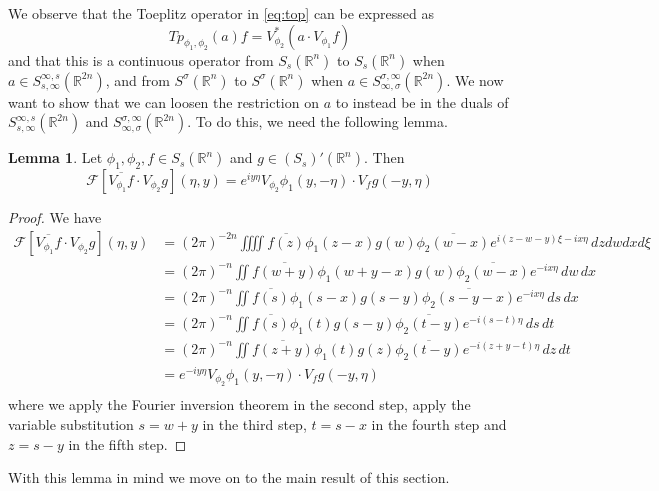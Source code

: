 \documentclass[11pt,a4paper,reqno]{amsart}
\numberwithin{equation}{section}
\theoremstyle{definition}
\newtheorem{lemma}[thm]{Lemma}
\theoremstyle{definition}
\begin{document}
    We observe that the Toeplitz operator in \eqref{eq:top} can be expressed as $$ Tp_{\phi_1,\phi_2}(a)f = V_{\phi_2}^*(a \cdot V_{\phi_1} f)$$
    and that this is a continuous operator from $S_s(\mathbb{R}^{n})$ to $S_s(\mathbb{R}^{n})$ when $a\in S_{s,\infty}^{\infty,s}(\mathbb{R}^{2 n})$, and from $S^\sigma(\mathbb{R}^{n})$ to $S^\sigma(\mathbb{R}^{n})$ when $a\in S_{\infty,\sigma}^{\sigma,\infty}(\mathbb{R}^{2 n})$. We now want to show that we can loosen the restriction on $a$ to instead be in the duals of $S_{s,\infty}^{\infty,s}(\mathbb{R}^{2 n})$ and $S_{\infty,\sigma}^{\sigma,\infty}(\mathbb{R}^{2 n})$. To do this, we need the following lemma.
    \begin{lemma}\label{lem:doubleFT}
    Let $\phi_1,\phi_2,f \in S_s(\mathbb{R}^n)$ and $g \in (S_s)'(\mathbb{R}^n)$. Then
    \begin{equation*}
        \mathscr{F} [\overline{V_{\phi_1} f} \cdot V_{\phi_2} g] (\eta,y) = e^{i y \eta} V_{\phi_2} \phi_1 (y,-\eta) \cdot   V_f g(-y,\eta)
    \end{equation*}
    \end{lemma}
    \begin{proof}
    We have
    \begin{align*}
      \mathscr{F} [\overline{V_{\phi_1} f} \cdot V_{\phi_2} g] (\eta,y) &= (2\pi)^{-2 n} \iiiint \overline{f(z)} \phi_1(z-x) g(w) \overline{\phi_2(w-x)} e^{i(z-w-y)\xi - i x\eta} \, d z d w d x d \xi \\ 
    &= (2\pi)^{- n} \iint \overline{f(w+y)} \phi_1(w+y-x) g(w) \overline{\phi_2(w-x)} e^{- i x\eta} \, d w \, d x \\
    &= (2\pi)^{- n} \iint \overline{f(s)} \phi_1(s-x) g(s-y) \overline{\phi_2(s-y-x)} e^{- i x\eta} \, d s \, d x \\
    &= (2\pi)^{- n} \iint \overline{f(s)} \phi_1(t) g(s-y) \overline{\phi_2(t-y)} e^{- i (s-t)\eta} \, d s \, d t \\
    &= (2\pi)^{- n} \iint \overline{f(z+y)} \phi_1(t) g(z) \overline{\phi_2(t-y)} e^{- i (z+y-t)\eta} \, d z \, d t \\
    &= e^{-i y \eta} V_{\phi_2} \phi_1 (y,-\eta) \cdot   V_f g(-y,\eta) \\
    \end{align*}
    where we apply the Fourier inversion theorem in the second step, apply the variable substitution $s = w + y$ in the third step, $t = s - x$ in the fourth step and $z = s - y$ in the fifth step.
    \end{proof}
    With this lemma in mind we move on to the main result of this section.
\end{document}
